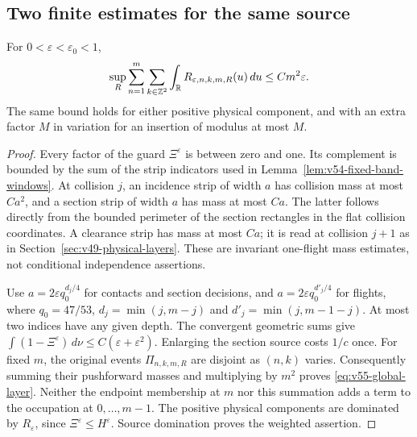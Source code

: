 \subsection{Two finite estimates for the same source}
\begin{lemma}
\label{lem:v55-global-layer}
For $0<\varepsilon<\varepsilon_0<1$,
\begin{equation}\label{eq:v55-global-layer}
 \sup_R\sum_{n=1}^m\sum_{k\in\Z^2}
        \int_{\R} R_{\varepsilon,n,k,m,R}(u)\,du
                         \le C m^2\varepsilon.
\end{equation}
The same bound holds for either positive physical component, and with
an extra factor $M$ in variation for an insertion of modulus at most $M$.
\end{lemma}
\begin{proof}
Every factor of the guard $\Xi^\varepsilon$ is between zero and one.
Its complement is bounded by the sum of the strip indicators used in
Lemma~\ref{lem:v54-fixed-band-windows}. At collision $j$, an incidence
strip of width $a$ has collision mass at most $Ca^2$, and a section
strip of width $a$ has mass at most $Ca$. The latter follows directly
from the bounded perimeter of the section rectangles in the flat
collision coordinates. A clearance strip has mass at most $Ca$;
it is read at collision $j+1$ as in
Section~\ref{sec:v49-physical-layers}. These are invariant one-flight
mass estimates, not conditional independence assertions.

Use $a=2\varepsilon q_0^{d_j/4}$ for contacts and section decisions,
and $a=2\varepsilon q_0^{d'_j/4}$ for flights, where
$q_0=47/53$, $d_j=\min(j,m-j)$ and
$d'_j=\min(j,m-1-j)$. At most two indices have any given depth.
The convergent geometric sums give
$\int(1-\Xi^\varepsilon)\,d\nu\le C(\varepsilon+\varepsilon^2)$.
Enlarging the section source costs $1/c$ once. For fixed $m$, the
original events $\Pi_{n,k,m,R}$ are disjoint as $(n,k)$ varies.
Consequently summing their pushforward masses and multiplying by $m^2$
proves \eqref{eq:v55-global-layer}. Neither the endpoint membership
at $m$ nor this summation adds a term to the occupation at
$0,\ldots,m-1$. The positive physical components are dominated by
$R_\varepsilon$, since $\Xi^\varepsilon\le H^\varepsilon$.
Source domination proves the weighted assertion.
\end{proof}

